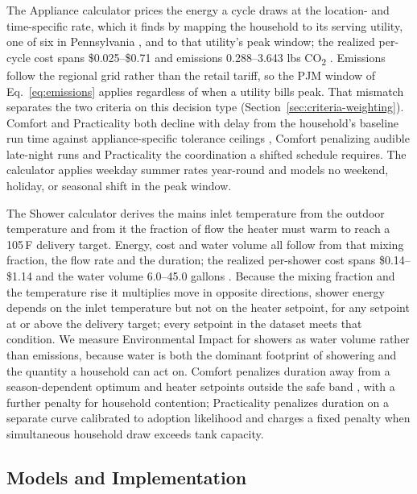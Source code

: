 \documentclass[final,3p,times]{elsarticle}
\begin{document}
The Appliance calculator prices the energy a cycle draws at the location- and time-specific rate, which it finds by mapping the household to its serving utility, one of six in Pennsylvania \cite{peco2021,ppl2025,firstenergy2025,firstenergy2026,duquesne2026}, and to that utility's peak window; the realized per-cycle cost spans \$0.025--\$0.71 and emissions 0.288--3.643 lbs CO\textsubscript{2} \cite{energystar_products}. Emissions follow the regional grid rather than the retail tariff, so the PJM window of Eq.~\ref{eq:emissions} applies regardless of when a utility bills peak. That mismatch separates the two criteria on this decision type (Section~\ref{sec:criteria-weighting}). Comfort and Practicality both decline with delay from the household's baseline run time against appliance-specific tolerance ceilings \cite{paetz2012,waseem2020}, Comfort penalizing audible late-night runs and Practicality the coordination a shifted schedule requires. The calculator applies weekday summer rates year-round and models no weekend, holiday, or seasonal shift in the peak window.

The Shower calculator derives the mains inlet temperature from the outdoor temperature \cite{burch2007,zhang2023} and from it the fraction of flow the heater must warm to reach a 105\,\textdegree{}F delivery target. Energy, cost and water volume all follow from that mixing fraction, the flow rate and the duration; the realized per-shower cost spans \$0.14--\$1.14 and the water volume 6.0--45.0 gallons \cite{epawatersense,reu2016,harrispoll2024}. Because the mixing fraction and the temperature rise it multiplies move in opposite directions, shower energy depends on the inlet temperature but not on the heater setpoint, for any setpoint at or above the delivery target; every setpoint in the dataset meets that condition. We measure Environmental Impact for showers as water volume rather than emissions, because water is both the dominant footprint of showering and the quantity a household can act on. Comfort penalizes duration away from a season-dependent optimum \cite{reu2016} and heater setpoints outside the safe band \cite{cdc2026}, with a further penalty for household contention; Practicality penalizes duration on a separate curve calibrated to adoption likelihood and charges a fixed penalty when simultaneous household draw exceeds tank capacity.

\FloatBarrier
\subsection{Models and Implementation}
\label{sec:models-implementation}
\end{document}
